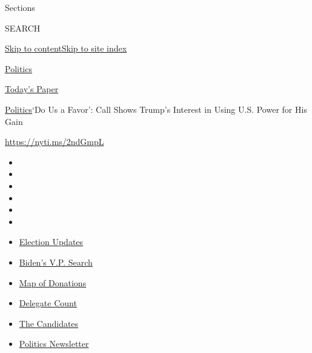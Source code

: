 Sections

SEARCH

\protect\hyperlink{site-content}{Skip to
content}\protect\hyperlink{site-index}{Skip to site index}

\href{https://www.nytimes.com/section/politics}{Politics}

\href{https://myaccount.nytimes.com/auth/login?response_type=cookie\&client_id=vi}{}

\href{https://www.nytimes.com/section/todayspaper}{Today's Paper}

\href{/section/politics}{Politics}\textbar{}`Do Us a Favor': Call Shows
Trump's Interest in Using U.S. Power for His Gain

\url{https://nyti.ms/2ndGmpL}

\begin{itemize}
\item
\item
\item
\item
\item
\item
\end{itemize}

\begin{itemize}
\item
  \href{https://www.nytimes.com/2020/07/31/us/elections/biden-vs-trump.html?action=click\&pgtype=Article\&state=default\&region=TOP_BANNER\&context=storylines_menu}{Election
  Updates}
\item
  \href{https://www.nytimes.com/article/biden-vice-president-2020.html?action=click\&pgtype=Article\&state=default\&region=TOP_BANNER\&context=storylines_menu}{Biden's
  V.P. Search}
\item
  \href{https://www.nytimes.com/interactive/2020/07/24/us/politics/trump-biden-campaign-donors.html?action=click\&pgtype=Article\&state=default\&region=TOP_BANNER\&context=storylines_menu}{Map
  of Donations}
\item
  \href{https://www.nytimes.com/interactive/2020/us/elections/delegate-count-primary-results.html?action=click\&pgtype=Article\&state=default\&region=TOP_BANNER\&context=storylines_menu}{Delegate
  Count}
\item
  \href{https://www.nytimes.com/interactive/2019/us/politics/2020-presidential-candidates.html?action=click\&pgtype=Article\&state=default\&region=TOP_BANNER\&context=storylines_menu}{The
  Candidates}
\item
  \href{https://www.nytimes.com/newsletters/politics?action=click\&pgtype=Article\&state=default\&region=TOP_BANNER\&context=storylines_menu}{Politics
  Newsletter}
\end{itemize}

